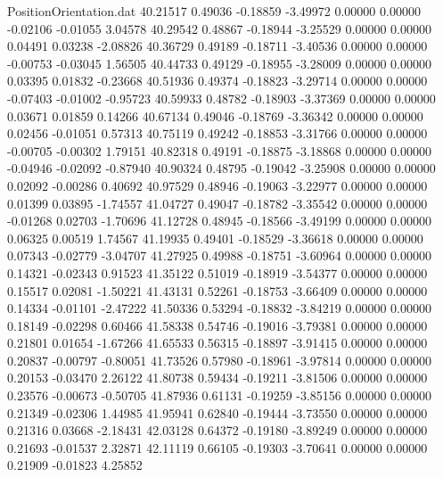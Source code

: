 \begin{filecontents}{PositionOrientation.dat}
  40.21517    0.49036   -0.18859    -3.49972    0.00000    0.00000   -0.02106   -0.01055    3.04578
  40.29542    0.48867   -0.18944    -3.25529    0.00000    0.00000    0.04491    0.03238   -2.08826
  40.36729    0.49189   -0.18711    -3.40536    0.00000    0.00000   -0.00753   -0.03045    1.56505
  40.44733    0.49129   -0.18955    -3.28009    0.00000    0.00000    0.03395    0.01832   -0.23668
  40.51936    0.49374   -0.18823    -3.29714    0.00000    0.00000   -0.07403   -0.01002   -0.95723
  40.59933    0.48782   -0.18903    -3.37369    0.00000    0.00000    0.03671    0.01859    0.14266
  40.67134    0.49046   -0.18769    -3.36342    0.00000    0.00000    0.02456   -0.01051    0.57313
  40.75119    0.49242   -0.18853    -3.31766    0.00000    0.00000   -0.00705   -0.00302    1.79151
  40.82318    0.49191   -0.18875    -3.18868    0.00000    0.00000   -0.04946   -0.02092   -0.87940
  40.90324    0.48795   -0.19042    -3.25908    0.00000    0.00000    0.02092   -0.00286    0.40692
  40.97529    0.48946   -0.19063    -3.22977    0.00000    0.00000    0.01399    0.03895   -1.74557
  41.04727    0.49047   -0.18782    -3.35542    0.00000    0.00000   -0.01268    0.02703   -1.70696
  41.12728    0.48945   -0.18566    -3.49199    0.00000    0.00000    0.06325    0.00519    1.74567
  41.19935    0.49401   -0.18529    -3.36618    0.00000    0.00000    0.07343   -0.02779   -3.04707
  41.27925    0.49988   -0.18751    -3.60964    0.00000    0.00000    0.14321   -0.02343    0.91523
  41.35122    0.51019   -0.18919    -3.54377    0.00000    0.00000    0.15517    0.02081   -1.50221
  41.43131    0.52261   -0.18753    -3.66409    0.00000    0.00000    0.14334   -0.01101   -2.47222
  41.50336    0.53294   -0.18832    -3.84219    0.00000    0.00000    0.18149   -0.02298    0.60466
  41.58338    0.54746   -0.19016    -3.79381    0.00000    0.00000    0.21801    0.01654   -1.67266
  41.65533    0.56315   -0.18897    -3.91415    0.00000    0.00000    0.20837   -0.00797   -0.80051
  41.73526    0.57980   -0.18961    -3.97814    0.00000    0.00000    0.20153   -0.03470    2.26122
  41.80738    0.59434   -0.19211    -3.81506    0.00000    0.00000    0.23576   -0.00673   -0.50705
  41.87936    0.61131   -0.19259    -3.85156    0.00000    0.00000    0.21349   -0.02306    1.44985
  41.95941    0.62840   -0.19444    -3.73550    0.00000    0.00000    0.21316    0.03668   -2.18431
  42.03128    0.64372   -0.19180    -3.89249    0.00000    0.00000    0.21693   -0.01537    2.32871
  42.11119    0.66105   -0.19303    -3.70641    0.00000    0.00000    0.21909   -0.01823    4.25852

\end{filecontents}
